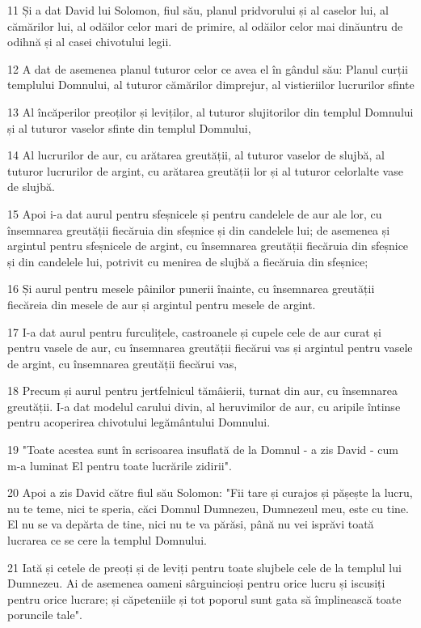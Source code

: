 \par 11 Și a dat David lui Solomon, fiul său, planul pridvorului și al caselor lui, al cămărilor lui, al odăilor celor mari de primire, al odăilor celor mai dinăuntru de odihnă și al casei chivotului legii.
\par 12 A dat de asemenea planul tuturor celor ce avea el în gândul său: Planul curții templului Domnului, al tuturor cămărilor dimprejur, al vistieriilor lucrurilor sfinte
\par 13 Al încăperilor preoților și leviților, al tuturor slujitorilor din templul Domnului și al tuturor vaselor sfinte din templul Domnului,
\par 14 Al lucrurilor de aur, cu arătarea greutății, al tuturor vaselor de slujbă, al tuturor lucrurilor de argint, cu arătarea greutății lor și al tuturor celorlalte vase de slujbă.
\par 15 Apoi i-a dat aurul pentru sfeșnicele și pentru candelele de aur ale lor, cu însemnarea greutății fiecăruia din sfeșnice și din candelele lui; de asemenea și argintul pentru sfeșnicele de argint, cu însemnarea greutății fiecăruia din sfeșnice și din candelele lui, potrivit cu menirea de slujbă a fiecăruia din sfeșnice;
\par 16 Și aurul pentru mesele pâinilor punerii înainte, cu însemnarea greutății fiecăreia din mesele de aur și argintul pentru mesele de argint.
\par 17 I-a dat aurul pentru furculițele, castroanele și cupele cele de aur curat și pentru vasele de aur, cu însemnarea greutății fiecărui vas și argintul pentru vasele de argint, cu însemnarea greutății fiecărui vas,
\par 18 Precum și aurul pentru jertfelnicul tămâierii, turnat din aur, cu însemnarea greutății. I-a dat modelul carului divin, al heruvimilor de aur, cu aripile întinse pentru acoperirea chivotului legământului Domnului.
\par 19 "Toate acestea sunt în scrisoarea insuflată de la Domnul - a zis David - cum m-a luminat El pentru toate lucrările zidirii".
\par 20 Apoi a zis David către fiul său Solomon: "Fii tare și curajos și pășește la lucru, nu te teme, nici te speria, căci Domnul Dumnezeu, Dumnezeul meu, este cu tine. El nu se va depărta de tine, nici nu te va părăsi, până nu vei isprăvi toată lucrarea ce se cere la templul Domnului.
\par 21 Iată și cetele de preoți și de leviți pentru toate slujbele cele de la templul lui Dumnezeu. Ai de asemenea oameni sârguincioși pentru orice lucru și iscusiți pentru orice lucrare; și căpeteniile și tot poporul sunt gata să împlinească toate poruncile tale".

